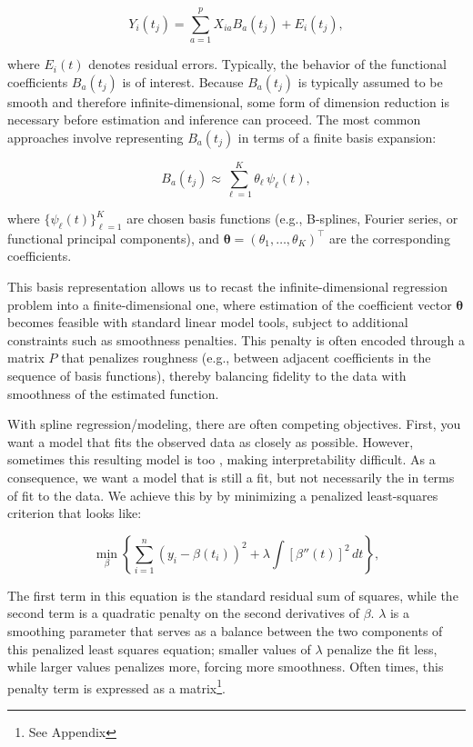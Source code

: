 \begin{equation}
    Y_i(t_j) = \sum_{a=1}^{p} X_{ia}B_a(t_j) + E_i(t_j),
\end{equation}

\noindent
where \(E_i(t)\) denotes residual errors.  Typically, the behavior of the functional coefficients \(B_a(t_j)\) is of interest.  
Because \(B_a(t_j)\) is typically assumed to be smooth and therefore infinite-dimensional, some form of dimension reduction is necessary before estimation and inference can proceed. The most common approaches involve representing \(B_a(t_j)\)  in terms of a finite basis expansion:

\begin{equation}
    B_a(t_j) \approx \sum_{\ell=1}^K \theta_\ell \, \psi_\ell(t),
\end{equation}

\noindent
where $\{\psi_\ell(t)\}_{\ell=1}^K$ are chosen basis functions (e.g., B-splines, Fourier series, or functional principal components), and $\boldsymbol\theta=(\theta_1,\ldots,\theta_K)^\top$ are the corresponding coefficients.  

This basis representation allows us to recast the infinite-dimensional regression problem into a finite-dimensional one, 
where estimation of the coefficient vector $\boldsymbol\theta$ becomes feasible with standard linear model tools, subject to additional constraints such as smoothness penalties. 
This penalty is often encoded through a matrix $P$ that penalizes roughness (e.g., between adjacent coefficients in the sequence of basis functions), thereby balancing fidelity to the data with smoothness of the estimated function.  

With spline regression/modeling, there are often competing objectives.  
First, you want a model that fits the observed data as closely as possible.  
However, sometimes this resulting model is too , making interpretability difficult.  
As a consequence, we want a model that is still a  fit, but not necessarily the  in terms of fit to the data.  
We achieve this by by minimizing a penalized least-squares criterion that looks like:

\begin{equation}
    \min_{\beta} \left\{ 
\sum_{i=1}^{n} \left( y_i - \beta(t_i) \right)^2 
+ \lambda \int \left[\beta''(t)\right]^2 \, dt
\right\},
\end{equation}

The first term in this equation is the standard residual sum of squares, while the second term is a quadratic penalty on the second derivatives of \(\beta\).  \(\lambda\) is a smoothing parameter that serves as a balance between the two components of this penalized least squares equation; smaller values of \(\lambda\) penalize the fit less, while larger values penalizes more, forcing more smoothness.  Often times, this penalty term is expressed as a matrix\footnote{See Appendix}.

